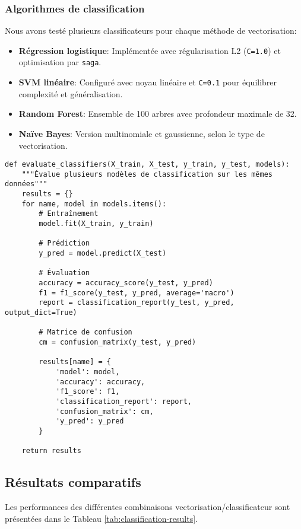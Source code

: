 \documentclass[a4paper,11pt]{article}
\begin{document}
\subsubsection{Algorithmes de classification}
Nous avons testé plusieurs classificateurs pour chaque méthode de vectorisation:

\begin{itemize}
    \item \textbf{Régression logistique}: Implémentée avec régularisation L2 (\texttt{C=1.0}) et optimisation par \texttt{saga}.
    
    \item \textbf{SVM linéaire}: Configuré avec noyau linéaire et \texttt{C=0.1} pour équilibrer complexité et généralisation.
    
    \item \textbf{Random Forest}: Ensemble de 100 arbres avec profondeur maximale de 32.
    
    \item \textbf{Naïve Bayes}: Version multinomiale et gaussienne, selon le type de vectorisation.
\end{itemize}

\begin{lstlisting}[caption={Extrait du code d'évaluation des modèles}, label=lst:eval-code]
def evaluate_classifiers(X_train, X_test, y_train, y_test, models):
    """Évalue plusieurs modèles de classification sur les mêmes données"""
    results = {}
    for name, model in models.items():
        # Entraînement
        model.fit(X_train, y_train)
        
        # Prédiction
        y_pred = model.predict(X_test)
        
        # Évaluation
        accuracy = accuracy_score(y_test, y_pred)
        f1 = f1_score(y_test, y_pred, average='macro')
        report = classification_report(y_test, y_pred, output_dict=True)
        
        # Matrice de confusion
        cm = confusion_matrix(y_test, y_pred)
        
        results[name] = {
            'model': model,
            'accuracy': accuracy,
            'f1_score': f1,
            'classification_report': report,
            'confusion_matrix': cm,
            'y_pred': y_pred
        }
    
    return results
\end{lstlisting}

\subsection{Résultats comparatifs}
Les performances des différentes combinaisons vectorisation/classificateur sont présentées dans le Tableau \ref{tab:classification-results}.
\end{document}
